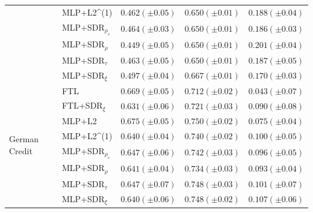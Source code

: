 \begin{tabular}{lllll}
 & MLP+L2^{(1)} & $0.462 (\pm0.05)$ & $0.650 (\pm0.01)$ & $0.188 (\pm0.04)$ \\
 & MLP+SDR$_{\rho_s}$ & $0.464 (\pm0.03)$ & $0.650 (\pm0.01)$ & $0.186 (\pm0.03)$ \\
 & MLP+SDR$_{\rho}$ & $0.449 (\pm0.05)$ & $0.650 (\pm0.01)$ & $0.201 (\pm0.04)$ \\
 & MLP+SDR$_{\tau}$ & $0.463 (\pm0.05)$ & $0.650 (\pm0.01)$ & $0.187 (\pm0.05)$ \\
 & MLP+SDR$_{\xi}$ & $0.497 (\pm0.04)$ & $0.667 (\pm0.01)$ & $0.170 (\pm0.03)$ \\
\cline{1-5}
\multirow[t]{8}{*}{German Credit} & FTL & $0.669 (\pm0.05)$ & $0.712 (\pm0.02)$ & $0.043 (\pm0.07)$ \\
 & FTL+SDR$_{\xi}$ & $0.631 (\pm0.06)$ & $0.721 (\pm0.03)$ & $0.090 (\pm0.08)$ \\
 & MLP+L2 & $0.675 (\pm0.05)$ & $0.750 (\pm0.02)$ & $0.075 (\pm0.04)$ \\
 & MLP+L2^{(1)} & $0.640 (\pm0.04)$ & $0.740 (\pm0.02)$ & $0.100 (\pm0.05)$ \\
 & MLP+SDR$_{\rho_s}$ & $0.647 (\pm0.06)$ & $0.742 (\pm0.03)$ & $0.096 (\pm0.05)$ \\
 & MLP+SDR$_{\rho}$ & $0.641 (\pm0.04)$ & $0.734 (\pm0.03)$ & $0.093 (\pm0.04)$ \\
 & MLP+SDR$_{\tau}$ & $0.647 (\pm0.07)$ & $0.748 (\pm0.03)$ & $0.101 (\pm0.07)$ \\
 & MLP+SDR$_{\xi}$ & $0.640 (\pm0.06)$ & $0.748 (\pm0.02)$ & $0.107 (\pm0.06)$ \\
\cline{1-5}
\bottomrule
\end{tabular}
